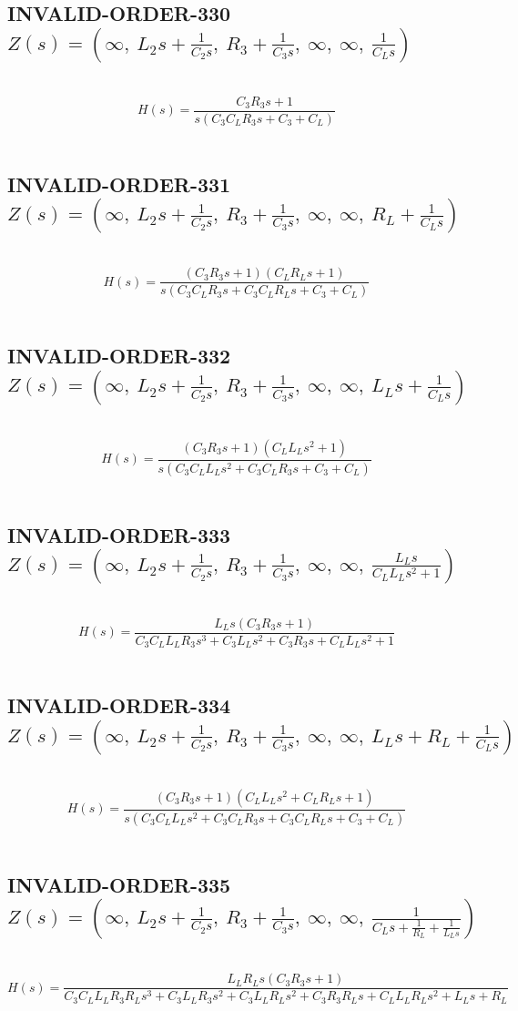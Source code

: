 \documentclass{article}
\begin{document}
\subsection{INVALID-ORDER-330 $Z(s) = \left( \infty, \  L_{2} s + \frac{1}{C_{2} s}, \  R_{3} + \frac{1}{C_{3} s}, \  \infty, \  \infty, \  \frac{1}{C_{L} s}\right)$ } \ 
\textbf{\[H(s) = \frac{C_{3} R_{3} s + 1}{s \left(C_{3} C_{L} R_{3} s + C_{3} + C_{L}\right)}\] } \ 
\subsection{INVALID-ORDER-331 $Z(s) = \left( \infty, \  L_{2} s + \frac{1}{C_{2} s}, \  R_{3} + \frac{1}{C_{3} s}, \  \infty, \  \infty, \  R_{L} + \frac{1}{C_{L} s}\right)$ } \ 
\textbf{\[H(s) = \frac{\left(C_{3} R_{3} s + 1\right) \left(C_{L} R_{L} s + 1\right)}{s \left(C_{3} C_{L} R_{3} s + C_{3} C_{L} R_{L} s + C_{3} + C_{L}\right)}\] } \ 
\subsection{INVALID-ORDER-332 $Z(s) = \left( \infty, \  L_{2} s + \frac{1}{C_{2} s}, \  R_{3} + \frac{1}{C_{3} s}, \  \infty, \  \infty, \  L_{L} s + \frac{1}{C_{L} s}\right)$ } \ 
\textbf{\[H(s) = \frac{\left(C_{3} R_{3} s + 1\right) \left(C_{L} L_{L} s^{2} + 1\right)}{s \left(C_{3} C_{L} L_{L} s^{2} + C_{3} C_{L} R_{3} s + C_{3} + C_{L}\right)}\] } \ 
\subsection{INVALID-ORDER-333 $Z(s) = \left( \infty, \  L_{2} s + \frac{1}{C_{2} s}, \  R_{3} + \frac{1}{C_{3} s}, \  \infty, \  \infty, \  \frac{L_{L} s}{C_{L} L_{L} s^{2} + 1}\right)$ } \ 
\textbf{\[H(s) = \frac{L_{L} s \left(C_{3} R_{3} s + 1\right)}{C_{3} C_{L} L_{L} R_{3} s^{3} + C_{3} L_{L} s^{2} + C_{3} R_{3} s + C_{L} L_{L} s^{2} + 1}\] } \ 
\subsection{INVALID-ORDER-334 $Z(s) = \left( \infty, \  L_{2} s + \frac{1}{C_{2} s}, \  R_{3} + \frac{1}{C_{3} s}, \  \infty, \  \infty, \  L_{L} s + R_{L} + \frac{1}{C_{L} s}\right)$ } \ 
\textbf{\[H(s) = \frac{\left(C_{3} R_{3} s + 1\right) \left(C_{L} L_{L} s^{2} + C_{L} R_{L} s + 1\right)}{s \left(C_{3} C_{L} L_{L} s^{2} + C_{3} C_{L} R_{3} s + C_{3} C_{L} R_{L} s + C_{3} + C_{L}\right)}\] } \ 
\subsection{INVALID-ORDER-335 $Z(s) = \left( \infty, \  L_{2} s + \frac{1}{C_{2} s}, \  R_{3} + \frac{1}{C_{3} s}, \  \infty, \  \infty, \  \frac{1}{C_{L} s + \frac{1}{R_{L}} + \frac{1}{L_{L} s}}\right)$ } \ 
\textbf{\[H(s) = \frac{L_{L} R_{L} s \left(C_{3} R_{3} s + 1\right)}{C_{3} C_{L} L_{L} R_{3} R_{L} s^{3} + C_{3} L_{L} R_{3} s^{2} + C_{3} L_{L} R_{L} s^{2} + C_{3} R_{3} R_{L} s + C_{L} L_{L} R_{L} s^{2} + L_{L} s + R_{L}}\] } \ 
\end{document}
